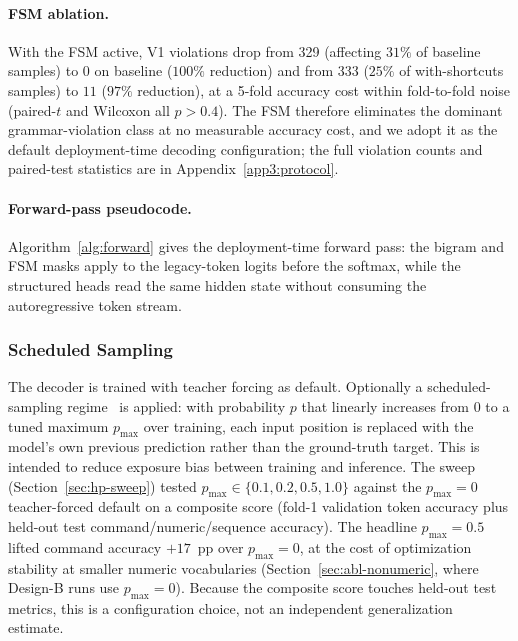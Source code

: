 \documentclass[sensors,article,submit,moreauthors,pdftex]{Definitions/mdpi}
\begin{document}
\paragraph{FSM ablation.} With the FSM active, V1 violations drop from 329 (affecting $31\%$ of baseline samples) to $0$ on baseline ($100\%$ reduction) and from 333 ($25\%$ of with-shortcuts samples) to $11$ ($97\%$ reduction), at a 5-fold accuracy cost within fold-to-fold noise (paired-$t$ and Wilcoxon all $p>0.4$). The FSM therefore eliminates the dominant grammar-violation class at no measurable accuracy cost, and we adopt it as the default deployment-time decoding configuration; the full violation counts and paired-test statistics are in Appendix~\ref{app3:protocol}.

\paragraph{Forward-pass pseudocode.} Algorithm~\ref{alg:forward} gives the deployment-time forward pass: the bigram and FSM masks apply to the legacy-token logits before the softmax, while the structured heads read the same hidden state without consuming the autoregressive token stream.


\subsubsection{Scheduled Sampling}
\label{sec:scheduled-sampling}

The decoder is trained with teacher forcing as default. Optionally a scheduled-sampling regime~\cite{scheduled_sampling} is applied: with probability $p$ that linearly increases from $0$ to a tuned maximum $p_{\text{max}}$ over training, each input position is replaced with the model's own previous prediction rather than the ground-truth target. This is intended to reduce exposure bias between training and inference. The sweep (Section~\ref{sec:hp-sweep}) tested $p_{\text{max}} \in \{0.1, 0.2, 0.5, 1.0\}$ against the $p_{\text{max}}\!=\!0$ teacher-forced default on a composite score (fold-1 validation token accuracy plus held-out test command/numeric/sequence accuracy). The headline $p_{\text{max}}\!=\!0.5$ lifted command accuracy $+17$~pp over $p_{\text{max}}\!=\!0$, at the cost of optimization stability at smaller numeric vocabularies (Section~\ref{sec:abl-nonumeric}, where Design-B runs use $p_{\text{max}}\!=\!0$). Because the composite score touches held-out test metrics, this is a configuration choice, not an independent generalization estimate.
\end{document}
